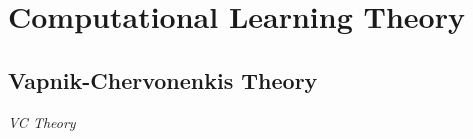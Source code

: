 \section{Computational Learning Theory}\label{sec:computational_learning_theory}




\subsection{Vapnik-Chervonenkis Theory}\label{sec:vc_theory}

\emph{VC Theory}
